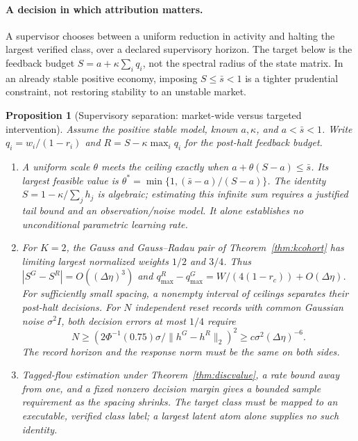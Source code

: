 \documentclass[12pt]{article}
\newtheorem{proposition}[theorem]{Proposition}
\theoremstyle{definition}
\theoremstyle{remark}
\begin{document}
\paragraph{A decision in which attribution matters.} A supervisor chooses between a uniform reduction in activity and halting the largest verified class, over a declared supervisory horizon. The target below is the feedback budget $S=a+\kappa\sum_i q_i$, not the spectral radius of the state matrix. In an already stable positive economy, imposing $S\le\bar s<1$ is a tighter prudential constraint, not restoring stability to an unstable market.

\begin{proposition}[Supervisory separation: market-wide versus targeted intervention]\label{prop:target}
Assume the positive stable model, known $a,\kappa$, and $a<\bar s<1$. Write $q_i=w_i/(1-r_i)$ and $R=S-\kappa\max_iq_i$ for the post-halt feedback budget.
\begin{enumerate}[label=(\roman*),itemsep=1pt]
\item A uniform scale $\theta$ meets the ceiling exactly when $a+\theta(S-a)\le\bar s$. Its largest feasible value is $\theta^*=\min\{1,(\bar s-a)/(S-a)\}$. The identity $S=1-\kappa/\sum_jh_j$ is algebraic; estimating this infinite sum requires a justified tail bound and an observation/noise model. It alone establishes no unconditional parametric learning rate.
\item For $K=2$, the Gauss and Gauss--Radau pair of Theorem~\ref{thm:kcohort} has limiting largest normalized weights $1/2$ and $3/4$. Thus $|S^G-S^R|=O((\Delta\eta)^3)$ and $q^R_{\max}-q^G_{\max}=W/(4(1-r_c))+O(\Delta\eta)$. For sufficiently small spacing, a nonempty interval of ceilings separates their post-halt decisions. For $N$ independent reset records with common Gaussian noise $\sigma^2 I$, both decision errors at most $1/4$ require
\[
 N\ge (2\Phi^{-1}(0.75)\sigma/\|h^G-h^R\|_2)^2
 \ge c\sigma^2(\Delta\eta)^{-6}.
\]
The record horizon and the response norm must be the same on both sides.
\item Tagged-flow estimation under Theorem~\ref{thm:discvalue}, a rate bound away from one, and a fixed nonzero decision margin gives a bounded sample requirement as the spacing shrinks. The target class must be mapped to an executable, verified class label; a largest latent atom alone supplies no such identity.
\end{enumerate}
\end{proposition}
\end{document}
